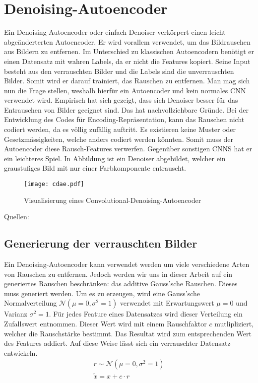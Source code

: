 \section{Denoising-Autoencoder}
Ein Denoising-Autoencoder oder einfach Denoiser verkörpert einen leicht abgeänderterten
Autoencoder. Er wird vorallem verwendet, um das Bildrauschen aus Bildern zu entfernen.
\para{}
Im Unterschied zu klassischen Autoencodern benötigt er einen Datensatz mit
wahren Labels, da er nicht die Features kopiert.
Seine Input besteht aus den verrauschten Bilder und die Labels sind die
unverrauschten Bilder. Somit wird er darauf trainiert, das Rauschen zu entfernen.
Man mag sich nun die Frage stellen, weshalb hierfür ein Autoencoder und
kein normales CNN verwendet wird. Empirisch hat sich gezeigt, dass sich
Denoiser besser für das Entrauschen von Bilder geeignet sind.
Das hat nachvollziehbare Gründe. Bei der
Entwicklung des Codes für Encoding-Repräsentation, kann das Rauschen nicht
codiert werden, da es völlig zufällig auftritt. Es existieren keine Muster oder
Gesetzmässigkeiten, welche anders codiert werden könnten. Somit muss der
Autoencoder diese Rausch-Features verwerfen. Gegenüber sonstigen CNNS hat er ein leichteres Spiel.
\para{}
In Abbildung  ist ein Denoiser abgebildet, welcher ein
graustufiges Bild mit nur einer Farbkomponente entrauscht.
\para{}
\begin{figure}[h!]
  \centering
  \texttt{[image: cdae.pdf]}
  \caption{Visualisierung eines Convolutional-Denoising-Autoencoder}
  \label{fig:denoiser}
\end{figure}
\para{}
Quellen: \cite{paper:denoiser}

\subsection{Generierung der verrauschten Bilder}
Ein Denoising-Autoencoder kann verwendet werden um viele verschiedene Arten von
Rauschen zu entfernen. Jedoch werden wir uns in dieser Arbeit auf ein
generiertes Rauschen beschränken: das additive Gauss'sche Rauschen.
Dieses muss generiert werden.
Um es zu erzeugen, wird eine Gauss'sche Normalverteilung
$\mathcal{N}(\mu = 0, \sigma^2 = 1)$ verwendet mit Erwartungswert $\mu = 0$ und Varianz
$\sigma^2 = 1$. Für jedes Feature eines Datensatzes wird dieser Verteilung ein
Zufallswert entnommen. Dieser Wert wird mit einem Rauschfaktor $c$
mutlipliziert, welcher die Rauschstärke bestimmt. Das Resultat wird zum
entsprechenden Wert des Features addiert.
Auf diese Weise lässt sich ein verrauschter Datensatz entwickeln.
\begin{gather*}
  r \sim \mathcal{N}(\mu = 0, \sigma^2 = 1) \\
  \tilde{x} = x + c \cdot r
\end{gather*}

